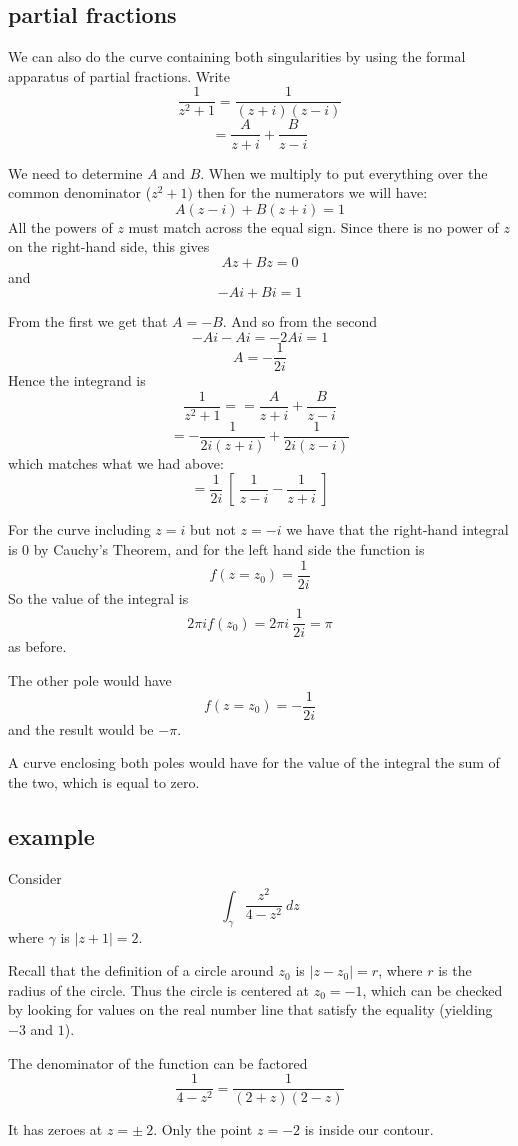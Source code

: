 \documentclass[11pt, oneside]{article}
\begin{document}
\subsection*{partial fractions}
We can also do the curve containing both singularities by using the formal apparatus of partial fractions.  Write
\[ \frac{1}{z^2 + 1} = \frac{1}{(z+i)(z-i)} \]
\[ = \frac{A}{z+i} + \frac{B}{z-i} \]

We need to determine $A$ and $B$.  When we multiply to put everything over the common denominator ($z^2 + 1)$ then for the numerators we will have:
\[ A(z-i) + B(z+i) = 1 \]
All the powers of $z$ must match across the equal sign.  Since there is no power of $z$ on the right-hand side,  this gives
\[ Az + Bz = 0 \]
and
\[ -Ai + Bi = 1 \]

From the first we get that $A = -B$.  And so from the second
\[ -Ai - Ai = -2Ai = 1 \]
\[ A = -\frac{1}{2i} \]
Hence the integrand is
\[ \frac{1}{z^2 + 1} = = \frac{A}{z+i} + \frac{B}{z-i} \]
\[ = -\frac{1}{2i(z+i)} + \frac{1}{2i(z-i)} \]
which matches what we had above:
\[ = \frac{1}{2i} \ [ \ \frac{1}{z - i} - \frac{1}{z+i} \ ] \]

For the curve including $z = i$ but not $z = -i$ we have that the right-hand integral is 0 by Cauchy's Theorem, and for the left hand side the function is
\[ f(z = z_0) = \frac{1}{2i} \]
So the value of the integral is
\[ 2 \pi i f(z_0) = 2 \pi i \ \frac{1}{2i} = \pi \]
as before.  

The other pole would have
\[ f(z = z_0) = -\frac{1}{2i} \]
and the result would be $- \pi$.  

A curve enclosing both poles would have for the value of the integral the sum of the two, which is equal to zero.

\subsection*{example}
Consider
\[ \int_{\gamma} \frac{z^2}{4-z^2} \ dz \]
where $\gamma$ is $ | z + 1 | = 2$.

Recall that the definition of a circle around $z_0$ is $| z - z_0 | = r$, where $r$ is the radius of the circle.  Thus the circle is centered at $z_0 = -1$, which can be checked by looking for values on the real number line that satisfy the equality (yielding $-3$ and $1$).

The denominator of the function can be factored
\[ \frac{1}{4-z^2} = \frac{1}{(2+z)(2-z)} \]

It has zeroes at $z = \pm \ 2$.  Only the point $z = -2$ is inside our contour.
\end{document}
